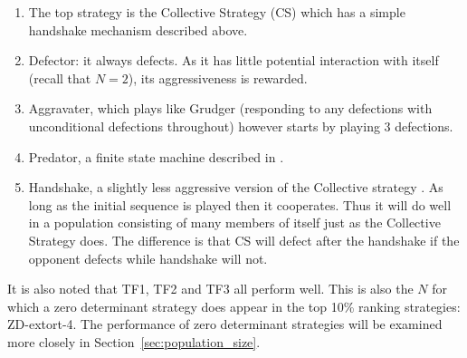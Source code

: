 \documentclass{article}
\begin{document}
\begin{enumerate}
    \item The top strategy is the Collective Strategy (CS) which has a simple
        handshake mechanism described above.
    \item Defector: it always defects. As it has little potential
        interaction with itself (recall that \(N=2\)), its
        aggressiveness is rewarded.
    \item Aggravater, which plays like Grudger (responding to any
        defections with unconditional defections throughout) however starts by
        playing 3 defections.
    \item Predator, a finite state machine described in \cite{Ashlock2006}.
    \item Handshake, a slightly less aggressive version of the Collective
        strategy \cite{robson1989}. As long as the initial sequence is played
        then it cooperates. Thus it will do well in a population consisting of
        many members of itself just as the Collective Strategy does. The
        difference is that CS will defect after the handshake if the opponent
        defects while handshake will not.
\end{enumerate}

It is also noted that TF1, TF2 and TF3 all perform well. This is also the \(N\)
for which a zero determinant strategy does appear in the top 10\% ranking
strategies: ZD-extort-4. The performance of zero determinant strategies will be
examined more closely in Section~\ref{sec:population_size}.
\end{document}

